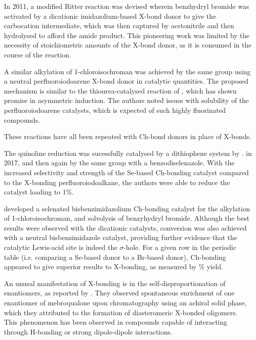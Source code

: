 \begin{refsection}
In 2011, a modified Ritter reaction was devised wherein benzhydryl bromide was activated by a dicationic imidazolium-based X-bond donor to give the carbocation intermediate, which was then captured by acetonitrile and then hydrolysed to afford the amide product.\autocite{Walter2011}
This pioneering work was limited by the necessity of stoichiometric amounts of the X-bond donor, as it is consumed in the course of the reaction.

A similar alkylation of 1-chloroisochroman was achieved by the same group using a neutral perfluoroiodoarene X-bond donor in catalytic quantities.\autocite{Kniep2013}
The proposed mechanism is similar to the thiourea-catalysed reaction of \citeauthor{Reisman2008}\autocite{Reisman2008}, which has shown promise in asymmetric induction.
The authors noted issues with solubility of the perfluoroiodoarene catalysts, which is expected of such highly fluorinated compounds.

These reactions have all been repeated with Ch-bond donors in place of X-bonds.

The quinoline reduction was sucessfully catalysed by a dithiophene system by \citeauthor{Benz2017}. in 2017\autocite{Benz2017}, and then again by the same group with a benzodiselenazole.\autocite{Benz2017a}
With the increased selectivity and strength of the Se-based Ch-bonding catalyst compared to the X-bonding perfluoroiodoalkane, the authors were able to reduce the catalyst loading to 1\%.

\citeauthor{Wonner2017} developed a selenated bisbenzimidazolium Ch-bonding catalyst for the alkylation of 1-chloroisochroman, and solvolysis of benzyhydryl bromide.\autocite{Wonner2017,Wonner2017a}
Although the best results were observed with the dicationic catalysts, conversion was also achieved with a neutral bisbenzimidazole catalyst, providing further evidence that the catalytic Lewis-acid site is indeed the $\sigma$-hole.
For a given row in the periodic table (i.e. comparing a Se-based donor to a Br-based donor), Ch-bonding appeared to give superior results to X-bonding, as measured by \% yield.

An unusal manifestation of X-bonding is in the self-disproportionation of enantiomers, as reported by \citeauthor{Soloshonok2017}.\autocite{Soloshonok2017}
They observed spontaneous enrichment of one enantiomer of mebroqualone upon chromatography using an achiral solid phase, which they attributed to the formation of diasteromeric X-bonded oligomers.
This phenomenon has been observed in compounds capable of interacting through H-bonding or strong dipole-dipole interactions.


\end{refsection}
